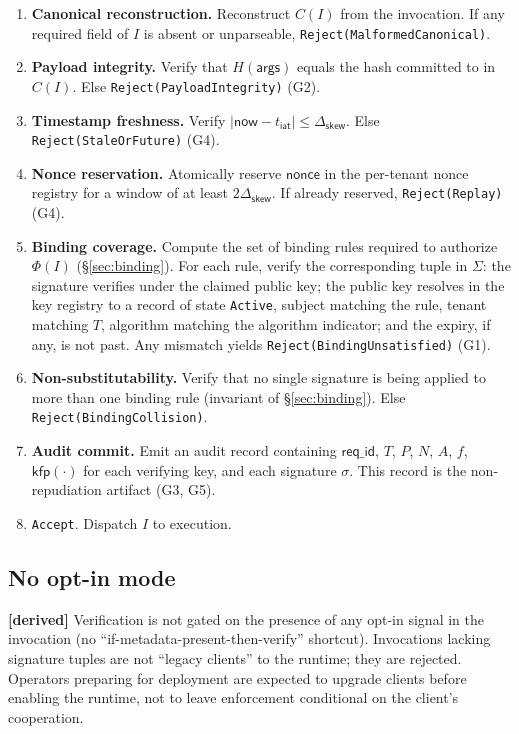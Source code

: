 \documentclass[11pt,a4paper]{article}
\newcommand{\derived}{\textcolor{derivedcolor}{\textbf{[derived]}}\xspace}
\begin{document}
\begin{enumerate}[leftmargin=2em,itemsep=0.15em]
    \item \textbf{Canonical reconstruction.} Reconstruct $C(I)$ from
    the invocation. If any required field of $I$ is absent or
    unparseable, \texttt{Reject(MalformedCanonical)}.
    \item \textbf{Payload integrity.} Verify that
    $H(\mathsf{args})$ equals the hash committed to in $C(I)$.
    Else \texttt{Reject(PayloadIntegrity)} (G2).
    \item \textbf{Timestamp freshness.} Verify
    $|\mathsf{now} - t_{\mathsf{iat}}| \le \Delta_{\mathsf{skew}}$.
    Else \texttt{Reject(StaleOrFuture)} (G4).
    \item \textbf{Nonce reservation.} Atomically reserve
    $\mathsf{nonce}$ in the per-tenant nonce registry for a window of
    at least $2\Delta_{\mathsf{skew}}$. If already reserved,
    \texttt{Reject(Replay)} (G4).
    \item \textbf{Binding coverage.} Compute the set of binding rules
    required to authorize $\Phi(I)$ (\S\ref{sec:binding}). For each
    rule, verify the corresponding tuple in $\Sigma$: the signature
    verifies under the claimed public key; the public key resolves in
    the key registry to a record of state \texttt{Active}, subject
    matching the rule, tenant matching $T$, algorithm matching the
    algorithm indicator; and the expiry, if any, is not past.
    Any mismatch yields \texttt{Reject(BindingUnsatisfied)} (G1).
    \item \textbf{Non-substitutability.} Verify that no single
    signature is being applied to more than one binding rule
    (invariant of \S\ref{sec:binding}). Else
    \texttt{Reject(BindingCollision)}.
    \item \textbf{Audit commit.} Emit an audit record containing
    $\mathsf{req\_id}$, $T$, $P$, $N$, $A$, $f$, $\mathsf{kfp}(\cdot)$
    for each verifying key, and each signature $\sigma$. This record
    is the non-repudiation artifact (G3, G5).
    \item \texttt{Accept}. Dispatch $I$ to execution.
\end{enumerate}

\subsection{No opt-in mode}

\derived{} Verification is not gated on the presence of any
opt-in signal in the invocation (no ``if-metadata-present-then-verify''
shortcut). Invocations lacking signature tuples are not ``legacy
clients'' to the runtime; they are rejected. Operators preparing for
deployment are expected to upgrade clients before enabling the runtime,
not to leave enforcement conditional on the client's cooperation.
\end{document}
